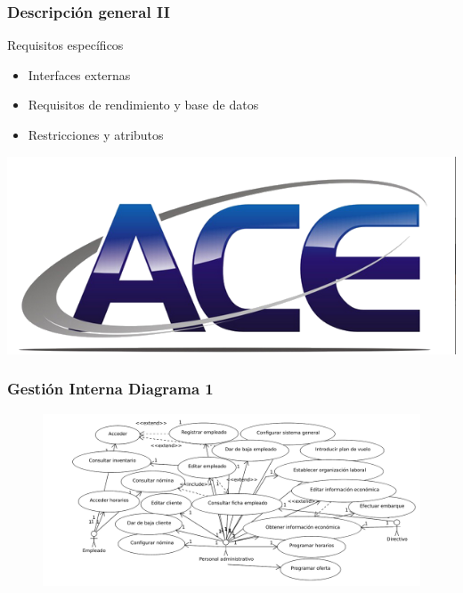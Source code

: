 \documentclass{beamer}
\begin{document}
\begin{frame}
	\frametitle{Descripción general \scriptsize{ II}}

	\begin{block}{Requisitos específicos}
	\begin{itemize}
		\item Interfaces externas \pause
		\item Requisitos de rendimiento y base de datos \pause
		\item Restricciones y atributos
	\end{itemize}
	\end{block}

	\includegraphics[width=\paperwidth]{logoace.png}
\end{frame}

\begin{frame}
	\frametitle{Gestión Interna \scriptsize{Diagrama 1}}
	
	\begin{figure}
		\hspace*{-1.2cm} \includegraphics[scale=.45]{gestioninterna1.pdf}
	\end{figure}
\end{frame}
\end{document}
